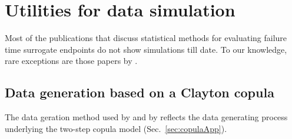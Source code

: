 \documentclass[article,shortnames, nojss]{jss}\usepackage[]{graphicx}\usepackage[]{color}
\begin{document}
\section{Utilities for data simulation}
Most of the publications that discuss
statistical methods for evaluating failure time surrogate endpoints
do not show simulations till date.
To our knowledge, rare exceptions are those papers by
\cite{BurzykowskiCortinas05, ShiEtal11, RenfroEtal12, Renfro2014, Renfro2015}.

\subsection{Data generation based on a Clayton copula}
The data geration method used by \cite{BurzykowskiCortinas05}
  and by \cite{Renfro2014, Renfro2015} reflects the data generating process 
  underlying the two-step copula model (Sec.~\ref{sec:copulaApp}).
\end{document}
